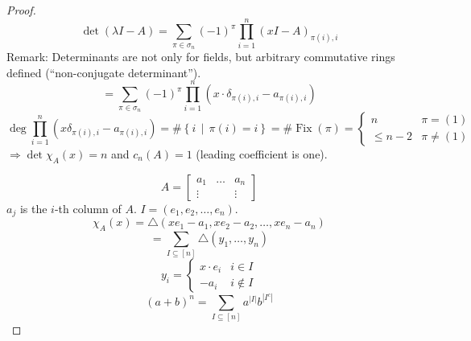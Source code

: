 \documentclass[a4paper,landscape,twocolumn]{article}
\newcommand\setdef[2]{\left\{#1\,\middle|\,#2\right\}}
\theoremstyle{definition}
\begin{document}
\begin{proof}
  \[ \det(\lambda I - A) = \sum_{\pi \in \sigma_n} (-1)^\pi \prod_{i=1}^n (x I - A)_{\pi(i),i} \]
  Remark: Determinants are not only for fields, but arbitrary commutative rings defined (\enquote{non-conjugate determinant}).
  \[ = \sum_{\pi \in \sigma_n} (-1)^\pi \prod_{i=1}^n (x \cdot \delta_{\pi(i),i} - a_{\pi(i),i}) \]
  \[
    \deg{\prod_{i=1}^n \left(x \delta_{\pi(i),i} - a_{\pi(i),i}\right)}
    = \#\setdef{i}{\pi(i) = i} = \#\operatorname{Fix}(\pi)
    = \begin{cases}
      n & \pi = (1) \\
      \leq n-2 & \pi \neq (1)
    \end{cases}
  \]
  $\Rightarrow \det{\chi_A(x)} = n$ and $c_n(A) = 1$ (leading coefficient is one).

  \[
    A = \begin{bmatrix}
      a_1 & \ldots & a_n \\
      \vdots &     & \vdots
    \end{bmatrix}
  \]
  $a_j$ is the $i$-th column of $A$.
  $I = (e_1, e_2, \ldots, e_n)$.
  \[ \chi_A(x) = \triangle(x e_1 - a_1, x e_2 - a_2, \ldots, x e_n - a_n) \]
  \[ = \sum_{I \subseteq [n]} \triangle(y_1, \ldots, y_n) \]
  \[
    y_i = \begin{cases}
      x \cdot e_i & i \in I \\
      -a_i & i \not\in I
    \end{cases}
  \] \[
    (a + b)^n = \sum_{I \subseteq [n]} a^{|I|} b^{|I^c|}
  \]



\end{proof}
\end{document}
